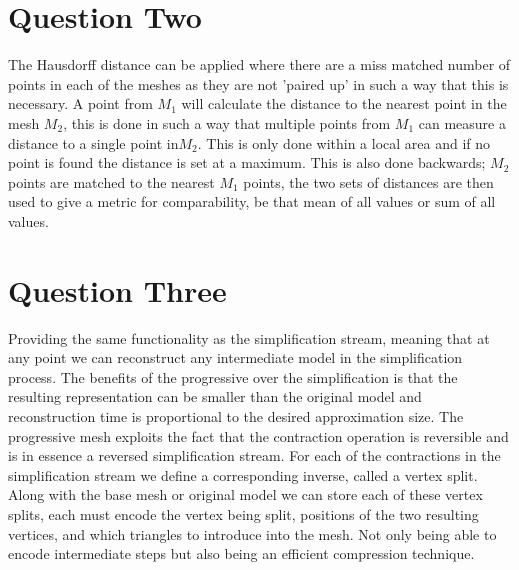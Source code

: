 \documentclass[paper=a4, fontsize=11pt]{scrartcl}
\numberwithin{equation}{section}		%
\numberwithin{figure}{section}			%
\numberwithin{table}{section}				%
\begin{document}
\section*{Question Two}

\iffalse
10 marks \\
100 words \\
Explain how the Hausdorff distance can serve as a metric to determine the dissimilarity
between two polygon meshes, even when these meshes are formed by different number
vertices and connectivity. \\
\fi

The Hausdorff distance can be applied where there are a miss matched number of points in each of the meshes as they are not 'paired up' in such a way that this is necessary. A point from $M_1$ will calculate the distance to the nearest point in the mesh $M_2$, this is done in such a way that multiple points from $M_1$ can measure a distance to a single point in$M_2$. This is only done within a local area and if no point is found the distance is set at a maximum. This is also done backwards; $M_2$ points are matched to the nearest $M_1$ points, the two sets of distances are then used to give a metric for comparability, be that mean of all values or sum of all values.

\section*{Question Three}

\iffalse
20 marks \\
200 words \\
Describe the data structure of progressive meshes. Analyse the rendering efficiency of
progressive meshes visualisation, given that the user is allowed to freely rotate the viewpoint
during the visualisation process. \\
\fi

Providing the same functionality as the simplification stream, meaning that at any point we can reconstruct any intermediate model in the simplification process. The benefits of the progressive over the simplification is that the resulting representation can be smaller than the original model and reconstruction time is proportional to the desired approximation size. The progressive mesh exploits the fact that the contraction operation is reversible and is in essence a reversed simplification stream. For each of the contractions in the simplification stream we define a corresponding inverse, called a vertex split. Along with the base mesh or original model we can store each of these vertex splits, each must encode the vertex being split, positions of the two resulting vertices, and which triangles to introduce into the mesh. Not only being able to encode intermediate steps but also being an efficient compression technique. \\
\end{document}
